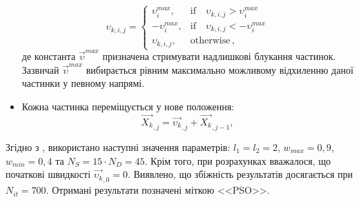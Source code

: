 \begin{itemize}[leftmargin=0cm,itemindent=1em]
 \begin{equation}
 \label{PSO_Vmax}
 \upsilon_{k,i,j}=\left\{
 \begin{array}{ll}
 \upsilon_{i}^{max},& \text{if} \quad \upsilon_{k,i,j}>\upsilon_{i}^{max}\\
 -\upsilon_{i}^{max},& \text{if} \quad \upsilon_{k,i,j}<-\upsilon_{i}^{max}\\
 \upsilon_{k,i,j},& \text{otherwise}\,,
 \end{array}
 \right.
 \end{equation}
де
константа $ \overrightarrow{\upsilon}^{max}$  призначена стримувати надлишкові блукання частинок.
Зазвичай \cite{PSO_Ye} $ \overrightarrow{\upsilon}^{max}$ вибирається рівним максимально можливому відхиленню даної частинки у певному напрямі.
 \item Кожна частинка переміщується у нове положення:
 \begin{equation}
 \label{eqPSO_Final}
 \overrightarrow{X_{k}}_{,j}=\overrightarrow{\upsilon_{k}}_{,j}+\overrightarrow{X_{k}}_{,j-1},
 \end{equation}
\end{itemize}
Згідно з \cite{PSO_Ye},  використано наступні значення параметрів:
$l_1=l_2=2$, $w_{max}=0,9$, $w_{min}=0,4$ та $N_S=15\cdot N_D=45$.
Крім того, при розрахунках вважалося, що початкові швидкості $\overrightarrow{\upsilon_{k}}_{,0}=0$.
Виявлено, що збіжність результатів досягається при $N_{it}=700$.
Отримані результати позначені міткою <<PSO>>.

